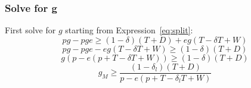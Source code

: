 \documentclass[12pt]{article}
\newcommand{\de}{\delta}
\begin{document}
\subsubsection{Solve for g}			
			First solve for $g$ starting from Expression~\ref{eq:split}:
					$$pg - pge \geq \left(1 - \de \right) \left( T + D \right) + eg \left( T - \de T + W \right)$$
					$$pg - pge - eg \left( T - \de T + W \right)\geq \left(1 - \de \right) \left( T + D \right)$$
					\begin{equation}
						g \left(p - e \left( p + T - \de T + W \right) \right) \geq \left(1 - \de \right) \left( T + D \right)
						\label{eq:g1}
					\end{equation}
					\begin{equation}
						g_M \geq \frac{\left(1 - \de_l \right) \left( T + D \right)}{p - e \left( p + T - \de_l T + W \right)}
						\label{eq:g2}
					\end{equation}
\end{document}
